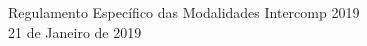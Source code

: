 \begin{center}

	\vspace*{\fill}
	\Huge{Regulamento Específico das Modalidades Intercomp 2019} \\ [.5cm]
	\normalsize{21 de Janeiro de 2019}
	\vspace*{\fill}

\end{center}
